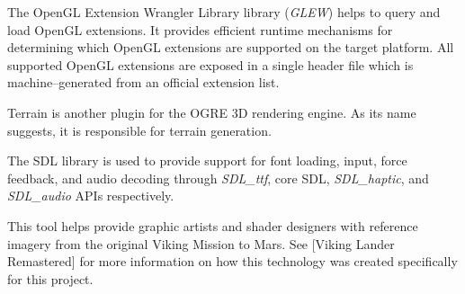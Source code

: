 
The OpenGL Extension Wrangler Library library ({\it GLEW}) helps to query and load OpenGL extensions. It provides efficient runtime mechanisms for determining which OpenGL extensions are supported on the target platform. All supported OpenGL extensions are exposed in a single header file which is machine--generated from an official extension list.


Terrain is another plugin for the OGRE 3D rendering engine. As its name suggests, it is responsible for terrain generation.


The SDL library is used to provide support for font loading, input, force feedback, and audio decoding through {\it SDL_ttf}, core SDL, {\it SDL_haptic}, and {\it SDL_audio} APIs respectively.


This tool helps provide graphic artists and shader designers with reference imagery from the original Viking Mission to Mars. See [Viking Lander Remastered] for more information on how this technology was created specifically for this project.
\stopitemize

